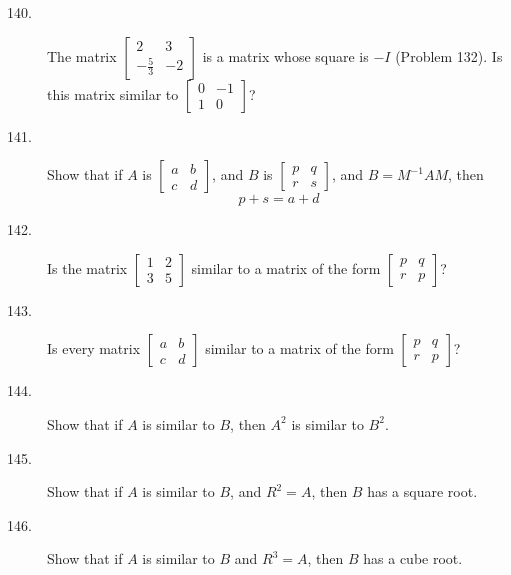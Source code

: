 \documentclass{article}
\begin{document}
\begin{description}
  \item[140.] The matrix $\begin{bmatrix} 2 & 3 \\ -\frac{5}{3} & -2 \end{bmatrix}$ is a matrix whose square is $-I$ (Problem 132). Is this matrix similar to $\begin{bmatrix} 0 & -1 \\ 1 & 0 \end{bmatrix}$?

  \item[141.] Show that if $A$ is $\begin{bmatrix} a & b \\ c & d \end{bmatrix}$, and $B$ is $\begin{bmatrix} p & q \\ r & s \end{bmatrix}$, and $B = M^{-1}AM$, then 
    \begin{equation*}
    p+s = a+d
    \end{equation*}

  \item[142.] Is the matrix $\begin{bmatrix} 1 & 2 \\ 3 & 5 \end{bmatrix}$ similar to a matrix of the form $\begin{bmatrix} p & q \\ r & p \end{bmatrix}$?

  \item[143.] Is every matrix $\begin{bmatrix} a & b \\ c & d \end{bmatrix}$ similar to a matrix of the form $\begin{bmatrix} p & q \\ r & p \end{bmatrix}$?

  \item[144.] Show that if $A$ is similar to $B$, then $A^2$ is similar to $B^2$.

  \item[145.] Show that if $A$ is similar to $B$, and $R^2 = A$, then $B$ has a square root.

  \item[146.] Show that if $A$ is similar to $B$ and $R^3 = A$, then $B$ has a cube root.

\end{description}
\end{document}
